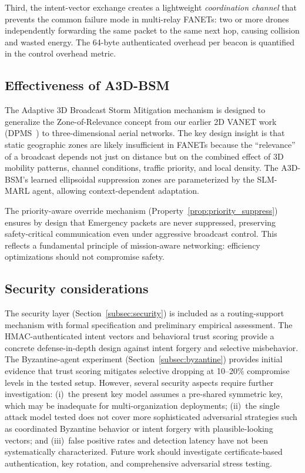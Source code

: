 \documentclass[5p,times]{elsarticle}
\begin{document}
Third, the intent-vector exchange creates a lightweight \emph{coordination channel} that prevents the common failure mode in multi-relay FANETs: two or more drones independently forwarding the same packet to the same next hop, causing collision and wasted energy. The 64-byte authenticated overhead per beacon is quantified in the control overhead metric.

\subsection{Effectiveness of A3D-BSM}

The Adaptive 3D Broadcast Storm Mitigation mechanism is designed to generalize the Zone-of-Relevance concept from our earlier 2D VANET work (DPMS~\cite{allani2018dpms}) to three-dimensional aerial networks. The key design insight is that static geographic zones are likely insufficient in FANETs because the ``relevance'' of a broadcast depends not just on distance but on the combined effect of 3D mobility patterns, channel conditions, traffic priority, and local density. The A3D-BSM's learned ellipsoidal suppression zones are parameterized by the SLM-MARL agent, allowing context-dependent adaptation.

The priority-aware override mechanism (Property~\ref{prop:priority_suppress}) ensures by design that Emergency packets are never suppressed, preserving safety-critical communication even under aggressive broadcast control. This reflects a fundamental principle of mission-aware networking: efficiency optimizations should not compromise safety.

\subsection{Security considerations}

The security layer (Section~\ref{subsec:security}) is included as a routing-support mechanism with formal specification and preliminary empirical assessment. The HMAC-authenticated intent vectors and behavioral trust scoring provide a concrete defense-in-depth design against intent forgery and selective misbehavior. The Byzantine-agent experiment (Section~\ref{subsec:byzantine}) provides initial evidence that trust scoring mitigates selective dropping at 10--20\% compromise levels in the tested setup. However, several security aspects require further investigation: (i)~the present key model assumes a pre-shared symmetric key, which may be inadequate for multi-organization deployments; (ii)~the single attack model tested does not cover more sophisticated adversarial strategies such as coordinated Byzantine behavior or intent forgery with plausible-looking vectors; and (iii)~false positive rates and detection latency have not been systematically characterized. Future work should investigate certificate-based authentication, key rotation, and comprehensive adversarial stress testing.
\end{document}
